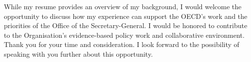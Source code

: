 \documentclass[11pt,a4paper,roman]{moderncv}
\begin{document}
\vspace{1em}
While my resume provides an overview of my background, I would welcome the opportunity to discuss how my experience can support the OECD's work and the priorities of the Office of the Secretary-General. I would be honored to contribute to the Organisation's evidence-based policy work and collaborative environment.\\

\vspace{1em}
Thank you for your time and consideration. I look forward to the possibility of speaking with you further about this opportunity.

\vspace{0.5cm}


\makeletterclosing
\end{document}
